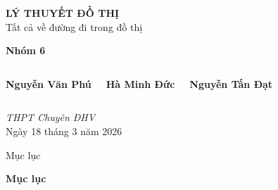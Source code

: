 \documentclass{beamer}
\begin{document}
\begin{frame}[plain]
    \centering
    \vspace{1cm}

    \begin{tcolorbox}[
            enhanced,
            colback=blue!70!black,
            colframe=blue!70!black,
            width=0.75\textwidth,
            arc=4mm,
            boxrule=0pt,
            drop shadow
        ]
        \centering
        {\color{white}\LARGE \textbf{LÝ THUYẾT ĐỒ THỊ}}\\[0.2cm]
        {\color{white}\large Tất cả về đường đi trong đồ thị}
    \end{tcolorbox}

    \vspace{1.2cm}

    \textbf{\LARGE Nhóm 6}

    \vspace{0.7cm}

    \begin{columns}
    \centering
    \textbf{Nguyễn Văn Phú}

    \centering
    \textbf{Hà Minh Đức}

    \centering
    \textbf{Nguyễn Tấn Đạt}
    \end{columns}

    \vspace{0.8cm}

    \textit{THPT Chuyên ĐHV} \\[0.2cm]
    \small Ngày 18 tháng 3 năm 2026

\end{frame}

\begin{frame}{Mục lục}
    \begin{center}
        \begin{block}{\textbf{Mục lục}}
            \begin{center}

                \vfill
                \begin{minipage}[c][0.5\textheight][c]{0.35\textwidth}
                    \tableofcontents
                \end{minipage}
                \vfill
            \end{center}
        \end{block}
    \end{center}
\end{frame}
\end{document}
